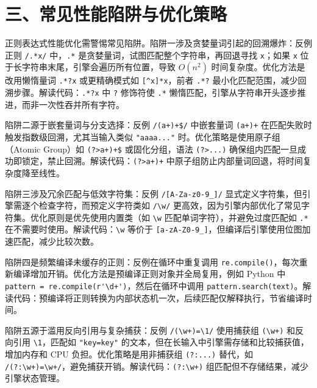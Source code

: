 \chapter{三、常见性能陷阱与优化策略}
正则表达式性能优化需警惕常见陷阱。陷阱一涉及贪婪量词引起的回溯爆炸：反例正则 \verb!/.*x/! 中，\verb!.*! 是贪婪量词，试图匹配整个字符串，再回退寻找 \verb!x!；如果 \verb!x! 位于长字符串末尾，引擎会遍历所有位置，导致 $O(n^2)$ 时间复杂度。优化方法是改用懒惰量词 \verb!.*?x! 或更精确模式如 \verb![^x]*x!，前者 \verb!.*?! 最小化匹配范围，减少回溯步骤。解读代码：\verb!.*?x! 中 \verb!?! 修饰符使 \verb!.*! 懒惰匹配，引擎从字符串开头逐步推进，而非一次性吞并所有字符。\par
陷阱二源于嵌套量词与分支选择：反例 \verb!/(a+)+$/! 中嵌套量词 \verb!(a+)+! 在匹配失败时触发指数级回溯，尤其当输入类似 \verb!"aaaa..."! 时。优化策略是使用原子组（Atomic Group）如 \verb!(?>a+)+$! 或固化分组，语法 \verb!(?>...)! 确保组内匹配一旦成功即锁定，禁止回溯。解读代码：\verb!(?>a+)+! 中原子组防止内部量词回退，将时间复杂度降至线性。\par
陷阱三涉及冗余匹配与低效字符集：反例 \verb!/[A-Za-z0-9_]/! 显式定义字符集，但引擎需逐个检查字符，而预定义字符类如 \verb!/\w/! 更高效，因为引擎内部优化了常见字符集。优化原则是优先使用内置类（如 \verb!\w! 匹配单词字符），并避免过度匹配如 \verb!.*! 在不需要时使用。解读代码：\verb!\w! 等价于 \verb![a-zA-Z0-9_]!，但编译后引擎使用位图加速匹配，减少比较次数。\par
陷阱四是频繁编译未缓存的正则：反例在循环中重复调用 \verb!re.compile()!，每次重新编译增加开销。优化方法是预编译正则对象并全局复用，例如 Python 中 \verb!pattern = re.compile(r'\d+')!，然后在循环中调用 \verb!pattern.search(text)!。解读代码：预编译将正则转换为内部状态机一次，后续匹配仅解释执行，节省编译时间。\par
陷阱五源于滥用反向引用与复杂捕获：反例 \verb!/(\w+)=\1/! 使用捕获组 \verb!(\w+)! 和反向引用 \verb!\1!，匹配如 \verb!"key=key"! 的文本，但在长输入中引擎需存储和比较捕获值，增加内存和 CPU 负担。优化策略是用非捕获组 \verb!(?:...)! 替代，如 \verb!/(?:\w+)=\w+/!，避免捕获开销。解读代码：\verb!(?:\w+)! 组匹配但不存储结果，减少引擎状态管理。\par
